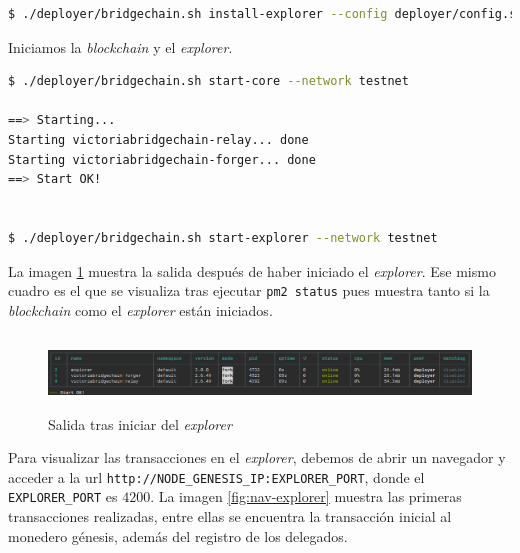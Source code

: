 \begin{lstlisting}[language=Bash,caption=Instalación \textit{blockchain}. Parte X, label=cod:install-explorer, style=Consola]
$ ./deployer/bridgechain.sh install-explorer --config deployer/config.sample.conf --skip-deps --non-interactive
\end{lstlisting}



Iniciamos la \textit{blockchain} y el \textit{explorer}.\\

\begin{lstlisting}[language=Bash,caption=Instalación \textit{blockchain}. Parte XII, label=cod:inicio-bridgechain, style=Consola]
$ ./deployer/bridgechain.sh start-core --network testnet

==> Starting...
Starting victoriabridgechain-relay... done
Starting victoriabridgechain-forger... done
==> Start OK!


$ ./deployer/bridgechain.sh start-explorer --network testnet
\end{lstlisting}

La imagen \ref{fig:install-explorer} muestra la salida después de haber iniciado el \textit{explorer}. Ese mismo cuadro es el que se visualiza tras ejecutar \texttt{pm2 status} pues muestra tanto si la \textit{blockchain} como el \textit{explorer} están iniciados.

\begin{figure}[h]
	\centering
	\includegraphics[width=14.5cm,height=2cm]{figuras/Instalacion_explorer.png}
	\caption{Salida tras iniciar del \textit{explorer}}
	\label{fig:install-explorer}
\end{figure}

Para visualizar las transacciones en el \textit{explorer}, debemos de abrir un navegador y acceder a la url \texttt{http://NODE\_GENESIS\_IP:EXPLORER\_PORT}, donde el \texttt{EXPLORER\_PORT} es $4200$. La imagen \ref{fig:nav-explorer} muestra las primeras transacciones realizadas, entre ellas se encuentra la transacción inicial al monedero génesis, además del registro de los delegados.

